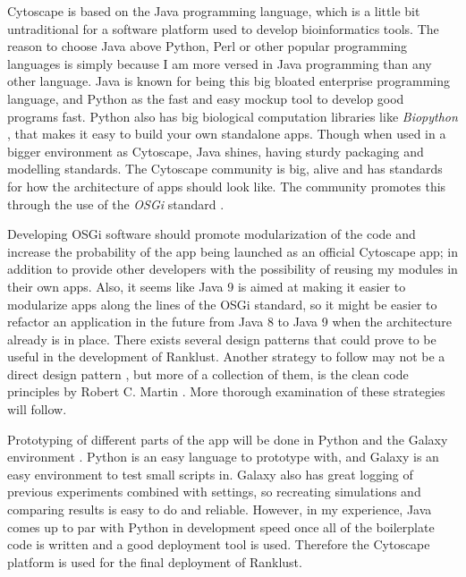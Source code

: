 \documentclass[UKenglish,11pt,a4paper]{article}
\begin{document}
Cytoscape is based on the Java programming language, which is a little bit untraditional for a software platform used to
develop bioinformatics tools. %
The reason to choose Java above Python, Perl or other popular programming languages is simply because I am more
versed in Java programming than any other language. Java is known for being this big bloated 
enterprise programming language, and Python as the fast and easy mockup tool to develop good programs fast. Python also
has big biological computation libraries like \emph{Biopython} \cite{biopython}, that makes it easy to build your own
standalone apps. Though when used in a bigger environment as Cytoscape, Java shines, having sturdy packaging and
modelling standards. The Cytoscape community is big, alive and has standards for how the architecture of apps should
look like. The community promotes this through the use of the \emph{OSGi} standard \cite{cytoscape-osgi}.

Developing OSGi software should promote modularization \cite{modularization} %
of the code and increase the probability of the app being launched as an official Cytoscape app; in addition to provide
other developers with the possibility of reusing my modules in their own apps. Also, it seems like Java 9 is aimed
at making it easier to modularize apps along the lines of the OSGi standard, so it might be easier to refactor an
application in the future from Java 8 to Java 9 when the architecture already is in place. There exists several design 
patterns that could prove to be useful in the development of Ranklust. Another strategy to follow may not be a direct 
design pattern \cite{designpattern}, but more of a collection of them, is the clean code principles by Robert C. Martin
\cite{cleancode}. More thorough examination of these strategies will follow.

Prototyping of different parts of the app will be done in Python and the Galaxy environment \cite{galaxy}. Python is an
easy language to prototype with, and Galaxy is an easy environment to test small scripts in. Galaxy also has great
logging of previous experiments combined with settings, so recreating simulations and comparing results is easy to do and
reliable. However, in my experience, Java comes up to par with Python in development speed once all of the boilerplate
code is written and a good deployment tool is used. Therefore the Cytoscape platform is used for the final deployment of
Ranklust.
\end{document}

